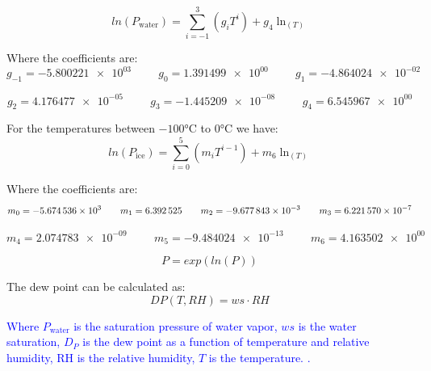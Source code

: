 \begin{equation}
    ln(P_{\text{water}}) = \sum_{i=-1}^3 (g_i T^{i}) + g_4 \ln_(T)
    \label{eq:lnvp}
\end{equation}

Where the coefficients are:
\begin{equation*}
    g_{-1} = \num{-5.800221e+03} \hspace{1cm}
    g_0 = \num{1.391499e+00} \hspace{1cm}
    g_1 = \num{-4.864024e-02}
\end{equation*}

\begin{equation*}
    g_2 = \num{4.176477e-05} \hspace{1cm}
    g_3 = \num{-1.445209e-08} \hspace{1cm}
    g_4 = \num{6.545967e+00}
\end{equation*}

For the temperatures between $-100\si{\celsius}$ to $0\si{\celsius}$ we have:
\begin{equation}
    ln(P_{\text{ice}}) = \sum_{i=0}^5 (m_i T^{i-1}) + m_6 \ln_(T)
    \label{eq:lnvp}
\end{equation}

Where the coefficients are:
\begin{equation*}
    m_0 = \num{-5.674536e+03} \hspace{0.7cm}
    m_1 = \num{6.392525e+00} \hspace{0.7cm}
    m_2 = \num{-9.677843e-03} \hspace{0.7cm}
    m_3 = \num{6.221570e-07}
\end{equation*}

\begin{equation*}
    m_4 = \num{2.074783e-09} \hspace{1cm}
    m_5 = \num{-9.484024e-13} \hspace{1cm}
    m_6 = \num{4.163502e+00} 
\end{equation*}


\begin{equation}
    P = exp(ln(P))
    \label{eq:ws}
\end{equation}

The dew point can be calculated as:
\begin{equation}
    DP(T, RH) = ws \cdot RH
    \label{eq:dewpoint}
\end{equation}

\textcolor{blue}{ Where $P_{\text{water}}$ is the saturation pressure of water vapor, $ws$ is the water saturation, $D_P$ is the dew point as a function of temperature and relative humidity, RH is the relative humidity, $T$ is the temperature. \cite{DPformula}. }



